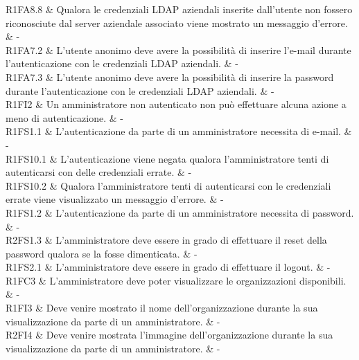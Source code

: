 R1FA8.8 & Qualora le credenziali LDAP aziendali inserite dall'utente non fossero riconosciute dal server aziendale associato viene mostrato un messaggio d'errore.  & - \\

R1FA7.2 & L'utente anonimo deve avere la possibilità di inserire l'e-mail durante l'autenticazione con le credenziali LDAP aziendali.  & - \\

R1FA7.3 & L'utente anonimo deve avere la possibilità di inserire la password durante l'autenticazione con le credenziali LDAP aziendali.  & - \\

R1FI2 & Un amministratore non autenticato non può effettuare alcuna azione a meno di autenticazione.  & - \\

R1FS1.1 & L’autenticazione da parte di un amministratore necessita di e-mail. & - \\

R1FS10.1 & L’autenticazione viene negata qualora l'amministratore tenti di autenticarsi con delle credenziali errate.  & - \\

R1FS10.2 & Qualora l'amministratore tenti di autenticarsi con le credenziali errate viene visualizzato un messaggio d’errore.  & - \\

R1FS1.2 & L’autenticazione da parte di un amministratore necessita di password. & - \\

R2FS1.3 & L'amministratore deve essere in grado di effettuare il reset della password qualora se la fosse dimenticata. & - \\

R1FS2.1 & L'amministratore deve essere in grado di effettuare il logout. & - \\

R1FC3 & L'amministratore deve poter visualizzare le organizzazioni disponibili. & - \\

R1FI3 & Deve venire mostrato il nome dell'organizzazione durante la sua visualizzazione da parte di un amministratore.  & - \\

R2FI4 & Deve venire mostrata l'immagine dell'organizzazione durante la sua visualizzazione da parte di un amministratore.  & - \\

